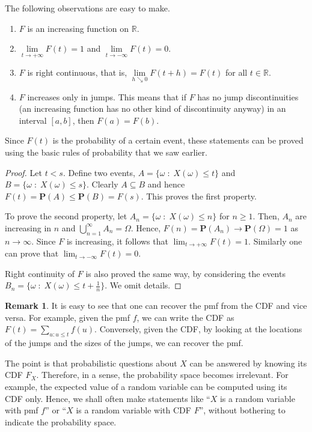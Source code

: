 \documentclass[preprint,  11pt]{amsart}
\newcommand{\para}[1]{\vspace{4mm}\noindent{\bfseries #1:}}
\theoremstyle{plain} %
\theoremstyle{definition} %
\newtheorem{remark}[theorem]{Remark}
\begin{document}
{{{{{{{{{{{{{{\para{Basic properties of a CDF} The following observations are easy to make.
{\begin{enumerate}\setlength\itemsep{6pt}
\item $F$ is an increasing function on $\mathbb{R}$.
\item $\lim\limits_{t\rightarrow +\infty}F(t)=1$ and $\lim\limits_{t\rightarrow -\infty}F(t)=0$.
\item $F$ is right continuous, that is, $\lim\limits_{h\searrow 0}F(t+h)=F(t)$ for all $t\in \mathbb{R}$.
\item $F$ increases only in jumps. This means that if $F$ has no jump discontinuities (an increasing function has no other kind of discontinuity anyway) in an interval $[a,b]$, then $F(a)=F(b)$.
\end{enumerate}
Since $F(t)$ is the probability of a certain event, these statements can be proved using the basic rules of probability that we saw earlier.

\begin{proof} Let $t<s$. Define two events, $A=\{\omega {\; : \;} X(\omega)\le t\}$ and $B=\{\omega{\; : \;} X(\omega)\le s\}$. Clearly $A\subseteq B$ and hence $F(t)=\mathbf{P}(A)\le \mathbf{P}(B)=F(s)$. This proves the first property.

To prove the second property, let $A_{n}=\{\omega {\; : \;} X(\omega)\le n\}$ for $n\ge 1$. Then, $A_{n}$ are increasing in $n$ and $\bigcup_{n=1}^{\infty}A_{n}=\Omega$. Hence, $F(n)=\mathbf{P}(A_{n})\rightarrow \mathbf{P}(\Omega)=1$ as $n\rightarrow \infty$. Since $F$ is increasing, it follows that $\lim_{t\rightarrow +\infty}F(t)=1$. Similarly one can prove that $\lim_{t\rightarrow -\infty}F(t)=0$.

Right continuity of $F$ is also proved the same way, by considering the events $B_{n}=\{\omega {\; : \;} X(\omega)\le t+\frac{1}{n}\}$. We omit details.
\end{proof}
\begin{remark}
It is easy to see that one can recover the pmf from the CDF and vice versa. For example, given the pmf $f$, we can write the CDF as $F(t)=\sum_{u:u\le t}f(u)$. Conversely, given the CDF, by looking at the locations of the jumps and the sizes of the jumps, we can recover the pmf.
\end{remark}

The point is that probabilistic questions about $X$ can be answered by knowing its CDF $F_{X}$. Therefore, in a sense, the probability space becomes irrelevant. For example, the expected value of a random variable can be computed using its CDF only. Hence, we shall often make statements like ``$X$ is a random variable with pmf $f$'' or ``$X$ is a random variable with CDF $F$'', without bothering to indicate the probability space.

}}}}}}}}}}}}}}}
\end{document}
